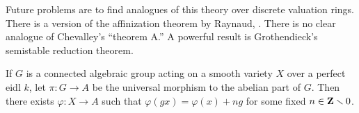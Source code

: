 Future problems are to find analogues of this theory over discrete valuation rings. 
There is a version of the affinization theorem by Raynaud, 
\cite[VI]{sga3}. There is no clear analogue of Chevalley's ``theorem A.'' 
A powerful result is Grothendieck's semistable reduction theorem. 

If $G$ is a connected algebraic group acting on a smooth variety $X$ over a 
perfect eidl $k$, let $\pi:G\to A$ be the universal morphism to the abelian 
part of $G$. Then there exists 
$\varphi:X\to A$ such that $\varphi(g x) = \varphi(x)+n g$ for some fixed 
$n\in\mathbf{Z}\smallsetminus 0$. 




